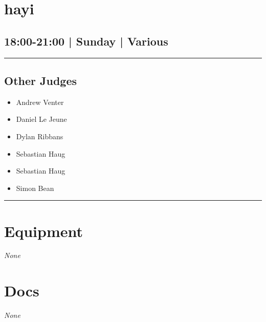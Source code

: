 \documentclass[10pt, A5]{article}
\begin{document}
        \begin{framed}
        \begin{minipage}{\textwidth}

        \setcounter{section}{95}
        \section{hayi}
        \subsection*{18:00-21:00 | Sunday | Various}

        \vspace{0.25cm}
        \hrule
        \vspace{0.25cm}


        \subsection*{Other Judges}
                    

        	\begin{multicols}{2}

		\begin{itemize}
									\item Andrew Venter
									\item Daniel Le Jeune
									\item Dylan Ribbans
									\item Sebastian Haug
						\end{itemize}

		\vfill\null
		\columnbreak

		\begin{itemize}
									\item Sebastian Haug
									\item Simon Bean
						\end{itemize}

		\vfill\null

		\end{multicols}

    \vspace{0.25cm}
        \hrule
        \vspace{0.25cm}

        \begin{multicols}{2}

		\section*{\faWrench \: Equipment}

				\textit{None}
		
		\vfill\null
		\columnbreak

			\section*{\faFile \: Docs}
		 	\textit{None}
	

		\vfill\null

		\end{multicols}
\end{minipage}
\end{framed}
    

	\clearpage

	
\end{document}
